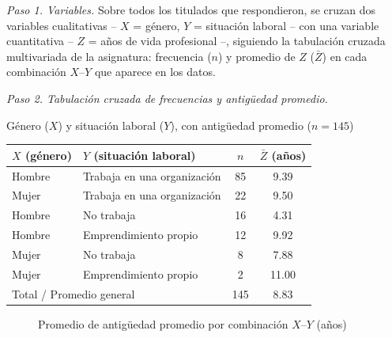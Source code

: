 \textit{Paso 1. Variables.} Sobre todos los titulados que respondieron, se cruzan dos variables cualitativas -- $X$ = género, $Y$ = situación laboral -- con una variable cuantitativa -- $Z$ = años de vida profesional --, siguiendo la tabulación cruzada multivariada de la asignatura: frecuencia ($n$) y promedio de $Z$ ($\bar{Z}$) en cada combinación $X$--$Y$ que aparece en los datos.

\textit{Paso 2. Tabulación cruzada de frecuencias y antigüedad promedio.}

\begin{mitabla}{Género ($X$) y situación laboral ($Y$), con antigüedad promedio ($n=145$)}
\begin{tabular}{llcc}
\toprule
$X$ (género) & $Y$ (situación laboral) & $n$ & $\bar{Z}$ (años) \\
\midrule
Hombre & Trabaja en una organización & 85 & 9.39 \\
Mujer & Trabaja en una organización & 22 & 9.50 \\
Hombre & No trabaja & 16 & 4.31 \\
Hombre & Emprendimiento propio & 12 & 9.92 \\
Mujer & No trabaja & 8 & 7.88 \\
Mujer & Emprendimiento propio & 2 & 11.00 \\
\midrule
\multicolumn{2}{l}{Total / Promedio general} & 145 & 8.83 \\
\bottomrule
\end{tabular}
\end{mitabla}

\begin{figure}[H]
\centering
\caption{Promedio de antigüedad promedio por combinación $X$--$Y$ (años)}
\end{figure}

